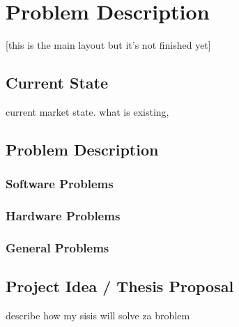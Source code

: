 \chapter{Problem Description}
\beginchapter
[this is the main layout but it's not finished yet]
\section{Current State}
current market state. what is existing,

\section{Problem Description}
\subsection{Software Problems}
\subsection{Hardware Problems}
\subsection{General Problems}

\section{Project Idea / Thesis Proposal}
describe how my sisis will solve za broblem